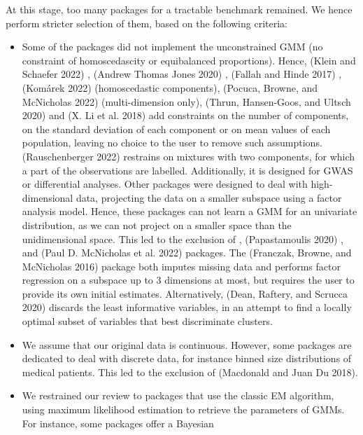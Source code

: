 At this stage, too many packages for a tractable benchmark remained. We
hence perform stricter selection of them, based on the following
criteria:

\begin{itemize}
\item
  Some of the packages did not implement the unconstrained GMM (no
  constraint of homoscedascity or equibalanced proportions). Hence,
   (Klein and Schaefer 2022) , 
  (Andrew Thomas Jones 2020) ,  (Fallah and Hinde 2017) , 
  (Komárek 2022) (homoscedastic components), 
  (Pocuca, Browne, and McNicholas 2022) (multi-dimension only), 
  (Thrun, Hansen-Goos, and Ultsch 2020) and  (X. Li et al. 2018) add
  constraints on the number of components, on the standard deviation
  of each component or on mean values of each population, leaving no
  choice to the user to remove such assumptions. 
  (Rauschenberger 2022) restrains on mixtures with two components, for which a
  part of the observations are labelled. Additionally, it is designed
  for GWAS or differential analyses. Other packages were designed to
  deal with high-dimensional data, projecting the data on a smaller
  subspace using a factor analysis model. Hence, these packages can
  not learn a GMM for an univariate distribution, as we can not
  project on a smaller space than the unidimensional space. This led
  to the exclusion of ,
   (Papastamoulis 2020) ,  and
   (Paul D. McNicholas et al. 2022) packages. The 
  (Franczak, Browne, and McNicholas 2016) package both imputes missing data and performs factor
  regression on a subspace up to 3 dimensions at most, but requires
  the user to provide its own initial estimates. Alternatively,  (Dean, Raftery, and Scrucca 2020) discards the least informative variables, in an attempt to find a locally optimal subset of variables that best discriminate clusters.
\item
  We assume that our original data is continuous. However, some
  packages are dedicated to deal with discrete data, for instance
  binned size distributions of medical patients. This led to the
  exclusion of  (Macdonald and Juan Du 2018).
\item
  We restrained our review to packages that use the classic EM
  algorithm, using maximum likelihood estimation to retrieve the
  parameters of GMMs. For instance, some packages offer a Bayesian

\end{itemize}
